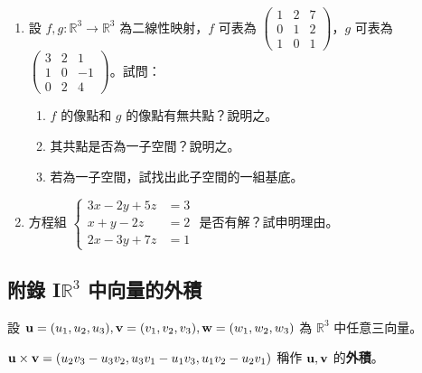 \begin{enumerate}[label=\arabic*., leftmargin=2em]
  \item[\textbf{*10.}] 設 $f, g: \mathbb{R}^3 \longrightarrow \mathbb{R}^3$ 為二線性映射，$f$ 可表為 $\begin{pmatrix} 1 & 2 & 7 \\ 0 & 1 & 2 \\ 1 & 0 & 1 \end{pmatrix}$，$g$ 可表為 $\begin{pmatrix} 3 & 2 & 1 \\ 1 & 0 & -1 \\ 0 & 2 & 4 \end{pmatrix}$。試問：
  \begin{enumerate}[label=(\roman*)]
    \item $f$ 的像點和 $g$ 的像點有無共點？說明之。
    \item 其共點是否為一子空間？說明之。
    \item 若為一子空間，試找出此子空間的一組基底。
  \end{enumerate}

  \item 方程組 $\left\{\begin{aligned}
  3x - 2y + 5z &= 3 \\
  x + y - 2z &= 2 \\
  2x - 3y + 7z &= 1
  \end{aligned}\right.$ 是否有解？試申明理由。
\end{enumerate}

\subsection*{附錄 I\quad \texorpdfstring{$\mathbb{R}^3$}{R3} 中向量的外積}\label{sec:b6s-ch1-app-crossproduct}
\resetsectcounters

設 $\boldsymbol{\mathbf{u}}=(u_1, u_2, u_3), \boldsymbol{\mathbf{v}}=(v_1, v_2, v_3), \boldsymbol{\mathbf{w}}=(w_1, w_2, w_3)$ 為 $\mathbb{R}^3$ 中任意三向量。

\begin{definition}\label{def:b6s-1-cross}
$\boldsymbol{\mathbf{u}} \times \boldsymbol{\mathbf{v}} = (u_2v_3 - u_3v_2, u_3v_1 - u_1v_3, u_1v_2 - u_2v_1)$ 稱作 $\boldsymbol{\mathbf{u}}, \boldsymbol{\mathbf{v}}$ 的\textbf{外積}。
\end{definition}

